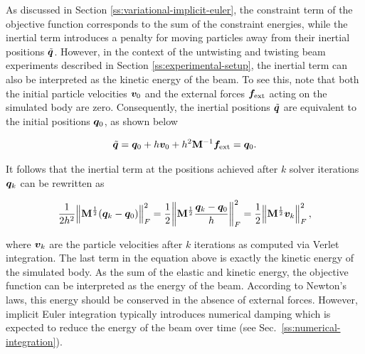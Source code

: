 As discussed in Section \ref{ss:variational-implicit-euler}, the constraint term of the objective function corresponds to the sum of the constraint energies, while the 
inertial term introduces a penalty for moving particles away from their inertial positions $\tilde{\bm{q}}$. However, in the context of the untwisting and twisting beam 
experiments described in Section \ref{ss:experimental-setup}, the inertial term can also be interpreted as the kinetic energy of the beam. To see this, note that both the initial 
particle velocities $\bm{v}_0$ and the external forces $\bm{f}_{\text{ext}}$ acting on the simulated body are zero. Consequently, the inertial positions $\tilde{\bm{q}}$ 
are equivalent to the initial positions $\bm{q}_0$, as shown below

\[ 
    \tilde{\bm{q}} = \bm{q}_0 + h\bm{v}_0 + h^2\mathbf{M}^{-1}\bm{f}_{\text{ext}} = \bm{q}_0.
\]

\noindent It follows that the inertial term at the positions achieved after $k$ solver iterations $\bm{q}_k$ can be rewritten as

\[
    \frac{1}{2h^2} \norm{\mathbf{M}^{\frac{1}{2}}(\bm{q}_k - \bm{q}_0)}^2_F 
    = \frac{1}{2} \norm{\mathbf{M}^{\frac{1}{2}}\frac{\bm{q}_k - \bm{q}_0}{h}}^2_F
    = \frac{1}{2} \norm{\mathbf{M}^{\frac{1}{2}}\bm{v}_k}^2_F,
\]

\noindent where $\bm{v}_k$ are the particle velocities after $k$ iterations as computed via Verlet integration. The last term in the equation above is exactly the 
kinetic energy of the simulated body. As the sum of the elastic and kinetic energy, the objective function can be interpreted as the energy of the beam. According 
to Newton's laws, this energy should be conserved in the absence of external forces. However, implicit Euler integration typically introduces numerical 
damping which is expected to reduce the energy of the beam over time (see Sec.\ \ref{ss:numerical-integration}).

